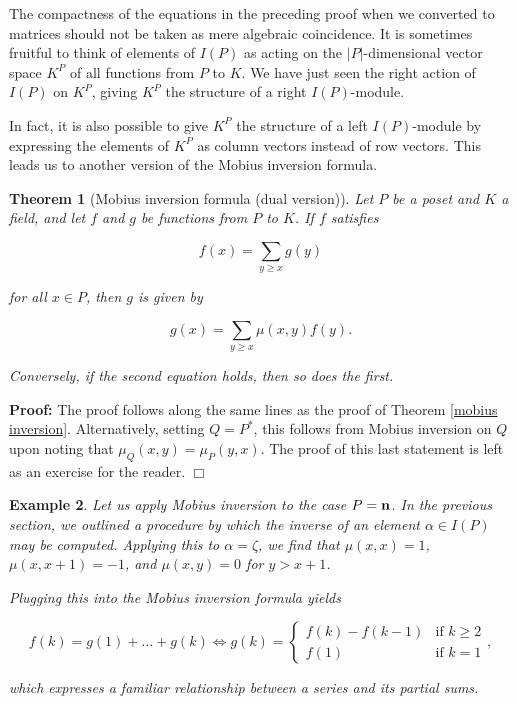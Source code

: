 \documentclass[11pt]{article}
\newtheorem{theorem}{Theorem}
\newtheorem{example}[theorem]{Example}
\newenvironment{proof}{\noindent \textbf{Proof:}}{$\Box$}
\begin{document}
The compactness of the equations in the preceding proof when we
converted to matrices should not be taken as mere algebraic
coincidence. It is sometimes fruitful to think of elements of $I(P)$
as acting on the $|P|$-dimensional vector space $K^P$ of all functions
from $P$ to $K$. We have just seen the right action of $I(P)$ on
$K^P$, giving $K^P$ the structure of a right $I(P)$-module. 

In fact, it is also possible to give $K^P$ the structure of a left
$I(P)$-module by expressing the elements of $K^P$ as column vectors
instead of row vectors. This leads us to another version of the Mobius
inversion formula.

\begin{theorem}[Mobius inversion formula (dual version)] \label{dual mobius inversion}
  Let $P$ be a poset and $K$ a field, and let $f$ and $g$ be functions
  from $P$ to $K$. If $f$ satisfies

  \[ f(x) = \sum_{y \ge x} g(y) \]

  for all $x \in P$, then $g$ is given by

  \[ g(x) = \sum_{y \ge x} \mu(x, y) f(y). \]

  Conversely, if the second equation holds, then so does the first.
\end{theorem}
\begin{proof}
The proof follows along the same lines as the proof of Theorem
\ref{mobius inversion}. Alternatively, setting $Q = P^*$, this follows
from Mobius inversion on $Q$ upon noting that $\mu_Q(x, y) = \mu_P(y,
x)$. The proof of this last statement is left as an exercise for the
reader.
\end{proof}

\begin{example} \label{P = n}
Let us apply Mobius inversion to the case $P = {\bf n}$. In the
previous section, we outlined a procedure by which the inverse of an
element $\alpha \in I(P)$ may be computed. Applying this to $\alpha =
\zeta$, we find that $\mu(x, x) = 1$, $\mu(x, x + 1) = -1$, and
$\mu(x, y) = 0$ for $y > x + 1$.

Plugging this into the Mobius inversion formula yields

\[ f(k) = g(1) + \ldots + g(k) \iff g(k) = \begin{cases} f(k) - f(k - 1) & \text{if $k \ge 2$} \\ f(1) & \text{if $k = 1$} \end{cases}, \]

which expresses a familiar relationship between a series and its
partial sums.
\end{example}
\end{document}
